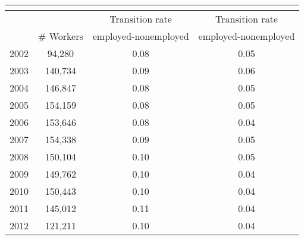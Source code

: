 \begin{tabular}{lccc}
  \multicolumn{4}{c}{{\scriptsize{}
  }}\tabularnewline
  \hline
  \hline
   &  & {\small{}Transition rate} & {\small{}Transition rate}\tabularnewline
   & {\small{}\# Workers } & {\small{}employed-nonemployed} & {\small{}employed-nonemployed}\tabularnewline
  \hline
  2002 & 94,280 & 0.08 & 0.05\tabularnewline
  2003 & 140,734 & 0.09 & 0.06\tabularnewline
  2004 & 146,847 & 0.08 & 0.05\tabularnewline
  2005 & 154,159 & 0.08 & 0.05\tabularnewline
  2006 & 153,646 & 0.08 & 0.04\tabularnewline
  2007 & 154,338 & 0.09 & 0.05\tabularnewline
  2008 & 150,104 & 0.10 & 0.05\tabularnewline
  2009 & 149,762 & 0.10 & 0.04\tabularnewline
  2010 & 150,443 & 0.10 & 0.04\tabularnewline
  2011 & 145,012 & 0.11 & 0.04\tabularnewline
  2012 & 121,211 & 0.10 & 0.04\tabularnewline
  \hline
\end{tabular}
